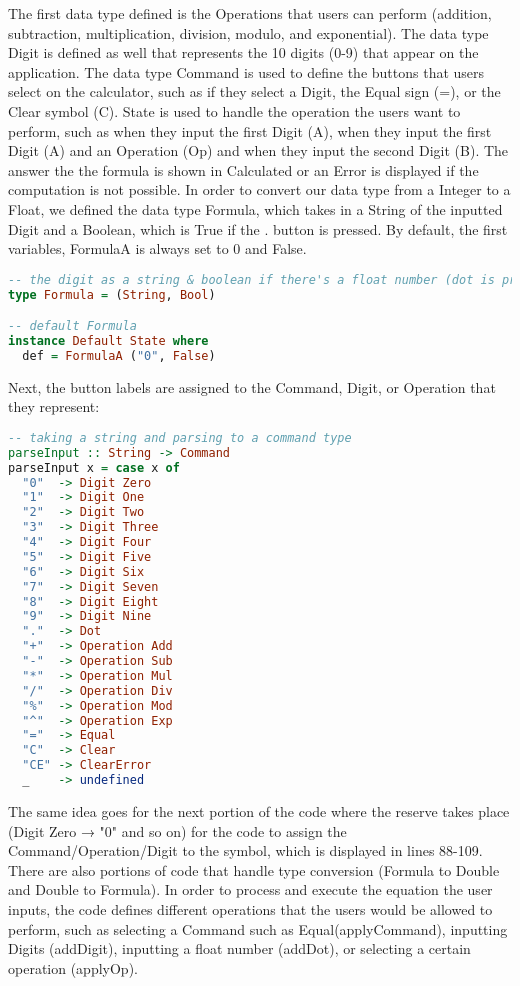 \documentclass{article}
\begin{document}
\noindent
The first data type defined is the Operations that users can perform (addition, subtraction, multiplication, division, modulo, and exponential). The data type Digit is defined as well that represents the 10 digits (0-9) that appear on the application. The data type Command is used to define the buttons that users select on the calculator, such as if they select a Digit, the Equal sign (=), or the Clear symbol (C). State is used to handle the operation the users want to perform, such as when they input the first Digit (A), when they input the first Digit (A) and an Operation (Op) and when they input the second Digit (B). The answer the the formula is shown in Calculated or an Error is displayed if the computation is not possible. In order to convert our data type from a Integer to a Float, we defined the data type Formula, which takes in a String of the inputted Digit and a Boolean, which is True if the $.$ button is pressed. By default, the first variables, FormulaA is always set to 0 and False. 

\begin{lstlisting}[language=Haskell]
-- the digit as a string & boolean if there's a float number (dot is pressed)
type Formula = (String, Bool)

-- default Formula 
instance Default State where
  def = FormulaA ("0", False)
\end{lstlisting}

\noindent
Next, the button labels are assigned to the Command, Digit, or Operation that they represent:

\begin{lstlisting}[language=Haskell]
-- taking a string and parsing to a command type
parseInput :: String -> Command
parseInput x = case x of
  "0"  -> Digit Zero
  "1"  -> Digit One
  "2"  -> Digit Two
  "3"  -> Digit Three
  "4"  -> Digit Four
  "5"  -> Digit Five
  "6"  -> Digit Six
  "7"  -> Digit Seven
  "8"  -> Digit Eight
  "9"  -> Digit Nine
  "."  -> Dot
  "+"  -> Operation Add
  "-"  -> Operation Sub
  "*"  -> Operation Mul
  "/"  -> Operation Div
  "%"  -> Operation Mod
  "^"  -> Operation Exp
  "="  -> Equal
  "C"  -> Clear
  "CE" -> ClearError
  _    -> undefined
\end{lstlisting}

\noindent
The same idea goes for the next portion of the code where the reserve takes place (Digit Zero → "0" and so on) for the code to assign the Command/Operation/Digit to the symbol, which is displayed in lines 88-109. There are also portions of code that handle type conversion (Formula to Double and Double to Formula). In order to process and execute the equation the user inputs, the code defines different operations that the users would be allowed to perform, such as selecting a Command such as Equal(applyCommand), inputting Digits (addDigit), inputting a float number (addDot), or selecting a certain operation (applyOp).
\end{document}
